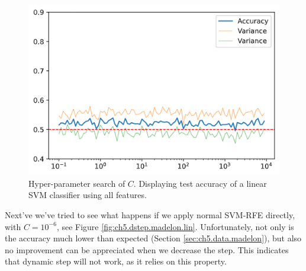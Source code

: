\begin{figure}[h]
    \centering
    \includegraphics[width=0.4\linewidth]{img/ch5/madelon-cv-c}
    \caption[Search for Madelon regularization parameter (linear kernel)]{Hyper-parameter search of $C$. Displaying test accuracy of a linear SVM classifier using all features.}
    \label{fig:ch5.dstep.madelon.reg}
\end{figure}

Next've we've tried to see what happens if we apply normal SVM-RFE directly, with $C=10^{-6}$, see Figure \ref{fig:ch5.dstep.madelon.lin}. Unfortunately, not only is the accuracy much lower than expected (Section \ref{sec:ch5.data.madelon}), but also no improvement can be appreciated when we decrease the step. This indicates that dynamic step will not work, as it relies on this property.

